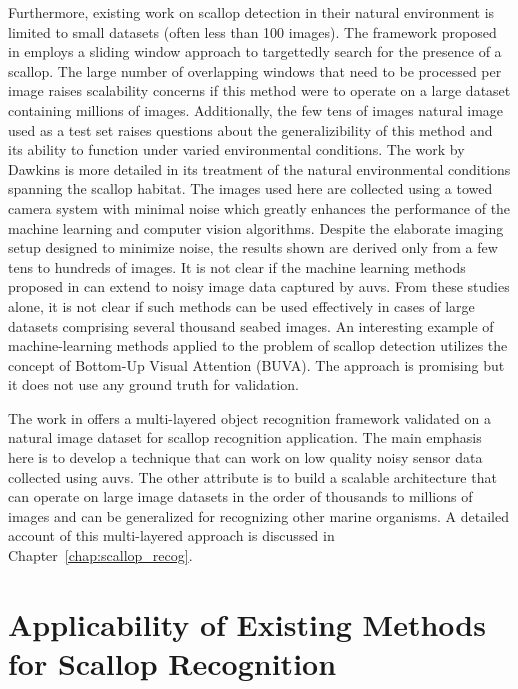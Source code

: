 \documentclass {udthesis}
\begin{document}
Furthermore,  existing work on scallop detection \cite{dawkings13, guomundsson} in their natural
environment is limited to small datasets (often less than 100 images). 
The framework proposed in \cite{guomundsson} employs a sliding window approach to targettedly search for the presence of a scallop. The large number of overlapping windows that need to be processed per image raises scalability concerns if this method were to operate 
on a large dataset containing millions of images. Additionally, the few tens of images natural image used as a test set raises questions about the generalizibility of this method and its ability to function under varied environmental conditions.
The work by Dawkins \cite{dawkings13} is more detailed in its treatment of the natural environmental conditions spanning the scallop habitat. The images used here are collected using a towed camera system with minimal noise which greatly enhances the performance of the machine learning and computer vision algorithms. Despite the elaborate imaging setup designed to minimize noise, the results shown are derived only from a few tens to hundreds of images.
It is not clear if the machine learning methods proposed in \cite{dawkings13} can extend to noisy image data captured by \gls{auv}s.
From these studies alone, it is not clear if such methods can be used effectively
in cases of large datasets comprising several thousand seabed images.
An interesting example of machine-learning methods applied to the
problem of scallop detection \cite{fearn} 
utilizes the concept of Bottom-Up Visual Attention (BUVA).
The approach is promising but it does not use any ground truth for validation.  

The work in \cite{prasanna_med, prasanna_aslo, prasanna_igi} offers a multi-layered object recognition framework validated on
a natural image dataset for scallop recognition application. 
The main emphasis here is to develop a technique that can work on low quality noisy sensor data collected using \gls{auv}s.
The other attribute is to build a scalable architecture that can operate on 
large image datasets in the order of thousands to millions of images
and can be generalized for recognizing other marine organisms.
A detailed account of this multi-layered approach is discussed in Chapter~\ref{chap:scallop_recog}.


\section{Applicability of Existing Methods for Scallop Recognition}
\end{document}
